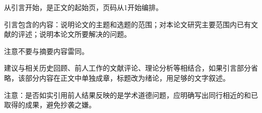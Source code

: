 

\begin{introduction}
从引言开始，是正文的起始页，页码从1开始编排。

引言包含的内容：说明论文的主题和选题的范围；对本论文研究主要范围内已有文献的评述；说明本论文所要解决的问题。

注意不要与摘要内容雷同。

建议与相关历史回顾、前人工作的文献评论、理论分析等相结合，如果引言部分省略，该部分内容在正文中单独成章，标题改为绪论，用足够的文字叙述。

注意：是否如实引用前人结果反映的是学术道德问题，应明确写出同行相近的和已取得的成果，避免抄袭之嫌。
\end{introduction}


